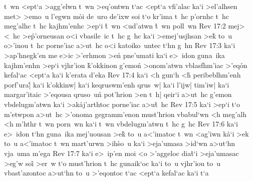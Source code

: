 t~wn
<ept`a
>agg'elwn
t~wn
>eq'ontwn
t`ac
<ept`a
vfi'alac
ka`i
>el'alhsen
met>
>emo~u
l'egwn
m\r{o}i
de~uro
de'ixw
soi
t`o
kr'ima
t~hc
p'ornhc
t~hc
meg'alhc
t~hc
kajhm'enhc
>ep`i
\r{t}~wn
<ud'atwn
\r{t}~wn
poll~wn\bibvsend
\vs Rev 17:2
mej>
<~hc
>e\r{p}'orneusan
o<i
vbasile~ic
t~hc
g~hc
ka`i
>emej'usjhsan
>ek\r{}
to~u
o>'inou
t~hc
porne'iac
a>ut~hc
o<i
katoiko~untec
t`hn
g~hn\bibvsend
\vs Rev 17:3
ka`i
>ap'hnegk'en
me
e>ic
>'erhmon
>e\r{n}
pne'umati
ka`i
e>~idon
guna~ika
kajhm'enhn
>ep`i
vjhr'ion
\r{k}'okkinon
g'emon\r{}
>onom'atwn
vblasfhm'iac
>'eq\r{o}n
kefal`ac
<ept`a
ka`i
k'erata
d'eka\bibvsend
\vs Rev 17:4
ka`i
<h
gun`h
<h\r{}
peribeblhm'enh
porf'ura|\r{}
ka`i
k'okkinw|
ka`i
keqruswm'enh
qrus~w|
ka`i
l'ijw|
tim'iw|
ka`i
margar'itaic
>'eqousa
qruso~un\r{}
pot'hrion
>en
t~h|
qeir`i
a>ut~hc
g'emon
vbdelugm'atwn
ka`i
>ak\r{a}j'arthtoc
porne'iac
a>u\r{t}~hc\bibvsend
{}
\vs Rev 17:5
ka`i
>ep`i
t`o
m'etwpon
a>ut~hc
>'onoma
gegramm'enon
must'hrion
vbabul`wn
<h
meg'alh
<h
m'hthr
t~wn
porn~wn
ka`i
t~wn
vbdelugm'atwn
t~hc
g~hc\bibvsend
\vs Rev 17:6
ka`i
e>~idon
t`hn
guna~ika
mej'uousan
>ek\r{}
to~u
a<'imatoc
t~wn
<ag'iwn
k\r{a}`i
>ek
to~u
a<'imatoc
t~wn
mart'urwn
>ih\r{s}o~u
ka`i
>eja'umasa
>id`wn
a>ut`hn
vja~uma
m'ega\bibvsend
\vs Rev 17:7
ka`i
e>~ip'en
moi
<o
>'aggeloc
dia\r{t}`i
>eja'umasac
>eg'w
soi\r{}
>er~w
t`o
must'hrion
t~hc
gunaik`oc
ka`i
to~u
vjhr'iou
to~u
vbast'azontoc
a>ut`hn
to~u
>'eqontoc
t`ac
<ept`a
kefal`ac
ka`i
t`a
